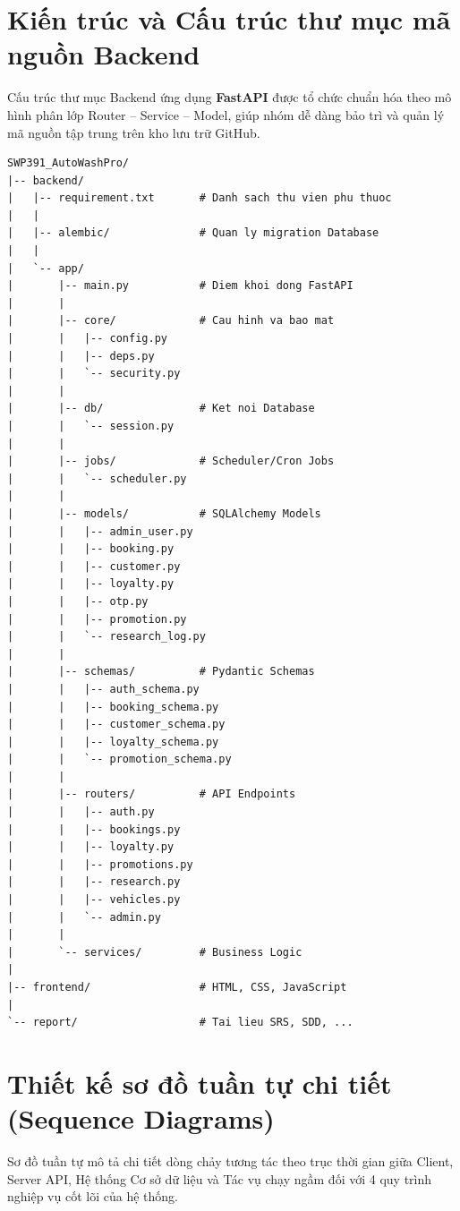 \newpage
\section{Kiến trúc và Cấu trúc thư mục mã nguồn Backend}
Cấu trúc thư mục Backend ứng dụng \textbf{FastAPI} được tổ chức chuẩn hóa theo mô hình phân lớp Router -- Service -- Model, giúp nhóm dễ dàng bảo trì và quản lý mã nguồn tập trung trên kho lưu trữ GitHub.

\begin{verbatim}
SWP391_AutoWashPro/
|-- backend/
|   |-- requirement.txt       # Danh sach thu vien phu thuoc
|   |
|   |-- alembic/              # Quan ly migration Database
|   |
|   `-- app/
|       |-- main.py           # Diem khoi dong FastAPI
|       |
|       |-- core/             # Cau hinh va bao mat
|       |   |-- config.py
|       |   |-- deps.py
|       |   `-- security.py
|       |
|       |-- db/               # Ket noi Database
|       |   `-- session.py
|       |
|       |-- jobs/             # Scheduler/Cron Jobs
|       |   `-- scheduler.py
|       |
|       |-- models/           # SQLAlchemy Models
|       |   |-- admin_user.py
|       |   |-- booking.py
|       |   |-- customer.py
|       |   |-- loyalty.py
|       |   |-- otp.py
|       |   |-- promotion.py
|       |   `-- research_log.py
|       |
|       |-- schemas/          # Pydantic Schemas
|       |   |-- auth_schema.py
|       |   |-- booking_schema.py
|       |   |-- customer_schema.py
|       |   |-- loyalty_schema.py
|       |   `-- promotion_schema.py
|       |
|       |-- routers/          # API Endpoints
|       |   |-- auth.py
|       |   |-- bookings.py
|       |   |-- loyalty.py
|       |   |-- promotions.py
|       |   |-- research.py
|       |   |-- vehicles.py
|       |   `-- admin.py
|       |
|       `-- services/         # Business Logic
|
|-- frontend/                 # HTML, CSS, JavaScript
|
`-- report/                   # Tai lieu SRS, SDD, ...
\end{verbatim}

\newpage
\section{Thiết kế sơ đồ tuần tự chi tiết (Sequence Diagrams)}
Sơ đồ tuần tự mô tả chi tiết dòng chảy tương tác theo trục thời gian giữa Client, Server API, Hệ thống Cơ sở dữ liệu và Tác vụ chạy ngầm đối với 4 quy trình nghiệp vụ cốt lõi của hệ thống.

